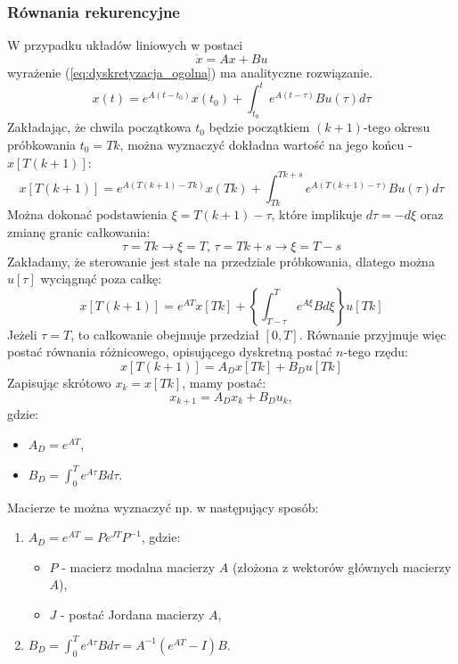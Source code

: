 \documentclass{article}
\begin{document}
        \subsubsection{Równania rekurencyjne}
        W przypadku układów liniowych w postaci
        $$
            \dot{x} = Ax + Bu
        $$
        wyrażenie (\ref{eq:dyskretyzacja_ogolna})  ma analityczne rozwiązanie.
        $$
            x(t) = e^{A(t-t_{0})}x(t_{0}) + \int_{t_{0}}^{t}{e^{A(t-\tau)}Bu(\tau)d\tau}
        $$
        Zakładając, że chwila początkowa $t_{0}$ będzie początkiem $(k+1)$-tego
        okresu próbkowania $t_{0} = Tk$, można wyznaczyć dokładna wartość na
        jego końcu - $x[T(k+1)]$:
        $$
            x[T(k+1)] = e^{A(T(k+1) - Tk)}x(Tk) + \int_{Tk}^{Tk+s}{e^{A(T(k+1) - \tau)}Bu(\tau)d\tau}
        $$
        Można dokonać podstawienia $\xi = T(k+1) - \tau$, które implikuje $d\tau = -d\xi$ oraz zmianę granic całkowania:
        $$
            \tau=Tk \rightarrow \xi = T,\,\tau =Tk + s \rightarrow \xi = T-s
        $$
        Zakładamy, że sterowanie jest stałe na przedziale próbkowania, dlatego można $u[\tau]$ wyciągnąć poza całkę:
        $$
            x[T(k+1)] = e^{AT}x[Tk] + \left\{ \int_{T-\tau}^{T}{e^{A\xi}Bd\xi} \right\} u[Tk]
        $$
        Jeżeli $\tau = T$, to całkowanie obejmuje przedział $[0,T]$.
        Równanie przyjmuje więc postać równania różnicowego, opisującego dyskretną postać $n$-tego rzędu:
        \begin{equation}
            \label{eq:rownanie_roznicowe}
            x[T(k+1)] = A_{D}x[Tk] + B_{D}u[Tk]
        \end{equation}
        Zapisując skrótowo $x_{k} = x[Tk]$, mamy postać:
        $$
            x_{k+1} = A_{D}x_{k} + B_{D}u_{k},
        $$
        gdzie:
        \begin{itemize}
            \item $A_{D} = e^{AT}$,
            \item $B_{D} = \int_{0}^{T}{e^{A\tau}Bd\tau}$.
        \end{itemize}

        Macierze te można wyznaczyć np. w następujący sposób:
        \begin{enumerate}
            \item $A_{D} =e^{AT} = Pe^{JT}P^{-1}$, gdzie:
                \begin{itemize}
                    \item $P$ - macierz modalna macierzy $A$ (złożona z wektorów głównych macierzy $A$),
                    \item $J$ - postać Jordana macierzy $A$,
                \end{itemize}

            \item $B_{D} = \int_{0}^{T}{e^{A\tau}Bd\tau} = A^{-1}\left( e^{AT} - I \right)B$.
        \end{enumerate}
\end{document}
